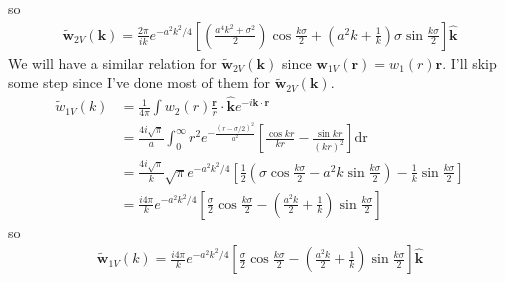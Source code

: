 \documentclass[letterpaper,twocolumn,amsmath,amssymb,prb]{revtex4-1}
\newcommand{\rr}{\textbf{r}}
\newcommand{\kk}{\textbf{k}}
\begin{document}
\begin{widetext}
so
\begin{align} 
  \tilde{\mathbf{w}}_{2V}(\kk) = \frac{2 \pi}{ik}e^{-a^2k^2/4}\left[ \left(\frac{a^4k^2 +
      \sigma^2}{2} \right) \cos{\frac{k\sigma}{2}} +
    \left(a^2k + \frac{1}{k} \right)\sigma \sin{\frac{k\sigma}{2}}
    \right] \mathbf{\hat{k}}
\end{align}
We will have a similar relation for $\tilde{\mathbf{w}}_{2V}(\kk)$
since $\mathbf{w}_{1V}(\rr) = w_1(r)\rr$.  I'll skip some step since
I've done most of them for $\tilde{\mathbf{w}}_{2V}(\kk)$.
\begin{align}
  \tilde{w}_{1V}(k) &= \frac{1}{4\pi}\int w_2(r)\frac{\rr}{r} \cdot \mathbf{\hat{k}} e^{-i\kk \cdot
  \rr} \\
  &= \frac{4i \sqrt{\pi}}{a}\int_0^\infty r^2
  e^{-\frac{(r-\sigma/2)^2}{a^2}} \left[ \frac{\cos{kr}}{kr}
    - \frac{\sin{kr}}{(kr)^2}\right] \mathrm{dr} \\
  &= \frac{4i \sqrt{\pi}}{k} \sqrt{\pi}e^{-a^2k^2/4} \left[
    \frac{1}{2} \left( \sigma \cos{\frac{k\sigma}{2}} - a^2k
    \sin{\frac{k\sigma}{2}} \right) -\frac{1}{k}
    \sin{\frac{k\sigma}{2}} \right] \\
  &= \frac{i4 \pi}{k} e^{-a^2k^2/4} \left[
    \frac{\sigma}{2} \cos{\frac{k\sigma}{2}} - \left( \frac{a^2k}{2}
    + \frac{1}{k} \right) \sin{\frac{k\sigma}{2}} \right]
\end{align}
so
\begin{align}
  \mathbf{\tilde{w}}_{1V}(k)= \frac{i4 \pi}{k} e^{-a^2k^2/4} \left[
    \frac{\sigma}{2} \cos{\frac{k\sigma}{2}} - \left( \frac{a^2k}{2}
    + \frac{1}{k} \right) \sin{\frac{k\sigma}{2}} \right]
  \mathbf{\hat{k}}
\end{align}
\end{widetext}

\end{document}
